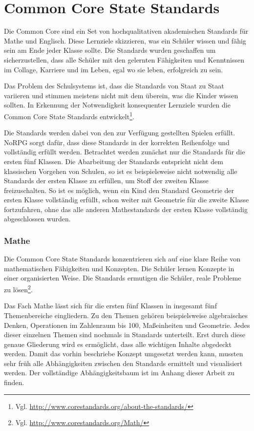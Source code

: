 \section{Common Core State Standards}
Die Common Core sind ein Set von hochqualitativen akademischen Standards für Mathe und Englisch. Diese Lernziele skizzieren, was ein Schüler wissen und fähig sein am Ende jeder Klasse sollte. Die Standards wurden geschaffen um sicherzustellen, dass alle Schüler mit den gelernten Fähigkeiten und Kenntnissen im Collage, Karriere und im Leben, egal wo sie leben, erfolgreich zu sein.

Das Problem des Schulsystems ist, dass die Standards von Staat zu Staat variieren und stimmen meistens nicht mit dem überein, was die Kinder wissen sollten. In Erkennung der Notwendigkeit konsequenter Lernziele wurden die Common Core State Standards entwickelt\footnote{Vgl. \url{http://www.corestandards.org/about-the-standards/}}.

Die Standards werden dabei von den zur Verfügung gestellten Spielen erfüllt. NoRPG sorgt dafür, dass diese Standards in der korrekten Reihenfolge und vollständig erfüllt werden. Betrachtet werden zunächst nur die Standards für die ersten fünf Klassen. Die Abarbeitung der Standards entspricht nicht dem klassischen Vorgehen von Schulen, so ist es beispielsweise nicht notwendig alle Standards der ersten Klasse zu erfüllen, um Stoff der zweiten Klasse freizuschalten. So ist es möglich, wenn ein Kind den Standard Geometrie der ersten Klasse vollständig erfüllt, schon weiter mit Geometrie für die zweite Klasse fortzufahren, ohne das alle anderen Mathestandards der ersten Klasse vollständig abgeschlossen wurden.

\subsubsection{Mathe}
Die Common Core State Standards konzentrieren sich auf eine klare Reihe von mathematischen Fähigkeiten und Konzepten. Die Schüler lernen Konzepte in einer organisierten Weise. Die Standards ermutigen die Schüler, reale Probleme zu lösen\footnote{Vgl. \url{http://www.corestandards.org/Math/}}.

Das Fach Mathe lässt sich für die ersten fünf Klassen in insgesamt fünf Themenbereiche eingliedern. Zu den Themen gehören beispielsweise algebraisches Denken, Operationen im Zahlenraum bis 100, Maßeinheiten und Geometrie. Jedes dieser einzelnen Themen sind nochmals in Standards unterteilt. Erst durch diese genaue Gliederung wird es ermöglicht, dass alle wichtigen Inhalte abgedeckt werden. Damit das vorhin beschriebe Konzept umgesetzt werden kann, mussten sehr früh alle Abhängigkeiten zwischen den Standards ermittelt und visualisiert werden. Der vollständige Abhängigkeitsbaum ist im Anhang dieser Arbeit zu finden.

